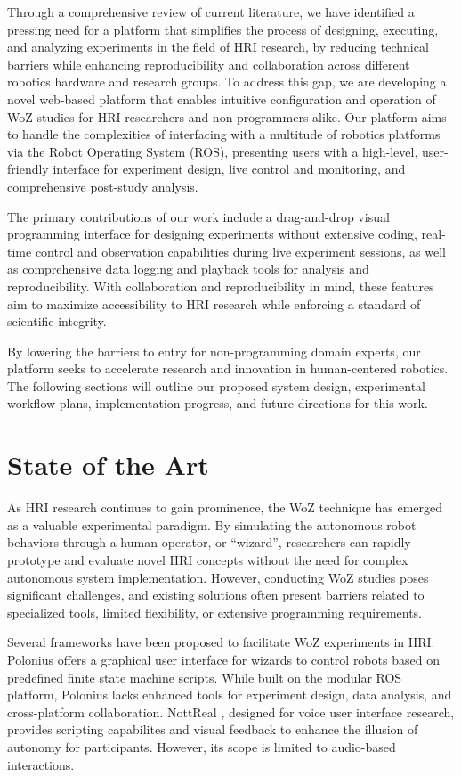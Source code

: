 \documentclass[letterpaper, 10 pt, conference]{ieeeconf}
\begin{document}
Through a comprehensive review of current literature, we have identified a pressing need for a platform that simplifies the process of designing, executing, and analyzing experiments in the field of HRI research, by reducing technical barriers while enhancing reproducibility and collaboration across different robotics hardware and research groups. To address this gap, we are developing a novel web-based platform that enables intuitive configuration and operation of WoZ studies for HRI researchers and non-programmers alike. Our platform aims to handle the complexities of interfacing with a multitude of robotics platforms via the Robot Operating System (ROS), presenting users with a high-level, user-friendly interface for experiment design, live control and monitoring, and comprehensive post-study analysis.

The primary contributions of our work include a drag-and-drop visual programming interface for designing experiments without extensive coding, real-time control and observation capabilities during live experiment sessions, as well as comprehensive data logging and playback tools for analysis and reproducibility. With collaboration and reproducibility in mind, these features aim to maximize accessibility to HRI research while enforcing a standard of scientific integrity.

By lowering the barriers to entry for non-programming domain experts, our platform seeks to accelerate research and innovation in human-centered robotics. The following sections will outline our proposed system design, experimental workflow plans, implementation progress, and future directions for this work.

\section{State of the Art}

As HRI research continues to gain prominence, the WoZ technique has emerged as a valuable experimental paradigm. By simulating the autonomous robot behaviors through a human operator, or ``wizard'', researchers can rapidly prototype and evaluate novel HRI concepts without the need for complex autonomous system implementation. However, conducting WoZ studies poses significant challenges, and existing solutions often present barriers related to specialized tools, limited flexibility, or extensive programming requirements.

Several frameworks have been proposed to facilitate WoZ experiments in HRI. Polonius \cite{Lu2011} offers a graphical user interface for wizards to control robots based on predefined finite state machine scripts. While built on the modular ROS platform, Polonius lacks enhanced tools for experiment design, data analysis, and cross-platform collaboration. NottReal \cite{Porcheron2020}, designed for voice user interface research, provides scripting capabilites and visual feedback to enhance the illusion of autonomy for participants. However, its scope is limited to audio-based interactions.
\end{document}
